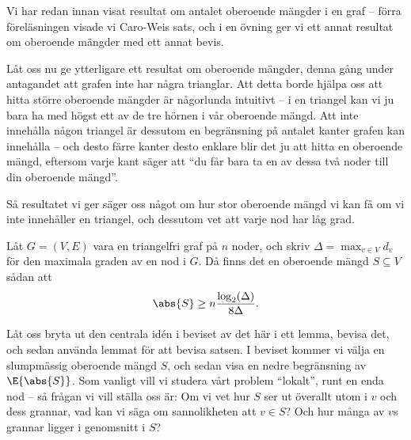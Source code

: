 \documentclass[nobib]{tufte-handout}
\begin{document}
Vi har redan innan visat resultat om antalet oberoende mängder i en graf -- förra föreläsningen visade vi Caro-Weis sats, och i en övning ger vi ett annat resultat om oberoende mängder med ett annat bevis.

Låt oss nu ge ytterligare ett resultat om oberoende mängder, denna gång under antagandet att grafen inte har några trianglar. Att detta borde hjälpa oss att hitta större oberoende mängder är någorlunda intuitivt -- i en triangel kan vi ju bara ha med högst ett av de tre hörnen i vår oberoende mängd. Att inte innehålla någon triangel är dessutom en begränsning på antalet kanter grafen kan innehålla 
-- och desto färre kanter desto enklare blir det ju att hitta en oberoende mängd, eftersom varje kant säger att ``du får bara ta en av dessa två noder till din oberoende mängd''.

Så resultatet vi ger säger oss något om hur stor oberoende mängd vi kan få om vi inte innehåller en triangel, och dessutom vet att varje nod har låg grad.

\begin{theorem}\label{thm:shearer_triangle_free_indep_set}
  Låt $G = (V, E)$ vara en triangelfri graf på $n$ noder, och skriv $\Delta = \max_{v \in V} d_v$ för den maximala graden av en nod i $G$. Då finns det en oberoende mängd $S \subseteq V$ sådan att
  $$\abs{S} \geq n\frac{\log_2(\Delta)}{8\Delta}.$$
\end{theorem}

Låt oss bryta ut den centrala idén i beviset av det här i ett lemma, bevisa det, och sedan använda lemmat för att bevisa satsen. I beviset kommer vi välja en slumpmässig oberoende mängd $S$, och sedan visa en nedre begränsning av $\E{\abs{S}}$. Som vanligt vill vi studera vårt problem ``lokalt'', runt en enda nod -- så frågan vi vill ställa oss är: Om vi vet hur $S$ ser ut överallt utom i $v$ och dess grannar, vad kan vi säga om sannolikheten att $v \in S$? Och hur många av $v$s grannar ligger i genomsnitt i $S$?
\end{document}
